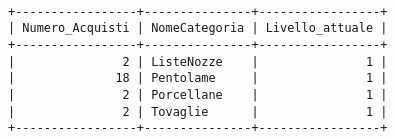 \begin{verbatim}

+-----------------+---------------+-----------------+
| Numero_Acquisti | NomeCategoria | Livello_attuale |
+-----------------+---------------+-----------------+
|               2 | ListeNozze    |               1 |
|              18 | Pentolame     |               1 |
|               2 | Porcellane    |               1 |
|               2 | Tovaglie      |               1 |
+-----------------+---------------+-----------------+

\end{verbatim}


